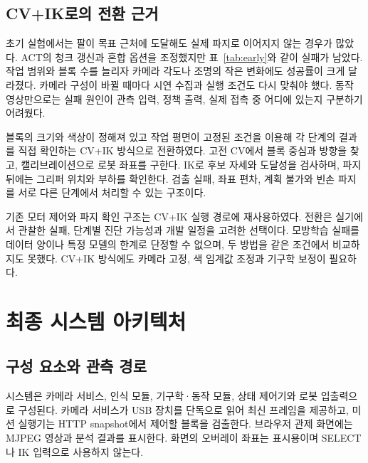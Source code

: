 \subsection{CV+IK로의 전환 근거}
초기 실험에서는 팔이 목표 근처에 도달해도 실제 파지로 이어지지 않는 경우가 많았다. ACT의 청크 갱신과 혼합 옵션을 조정했지만 표~\ref{tab:early}와 같이 실패가 남았다. 작업 범위와 블록 수를 늘리자 카메라 각도나 조명의 작은 변화에도 성공률이 크게 달라졌다. 카메라 구성이 바뀔 때마다 시연 수집과 실행 조건도 다시 맞춰야 했다. 동작 영상만으로는 실패 원인이 관측 입력, 정책 출력, 실제 접촉 중 어디에 있는지 구분하기 어려웠다.

블록의 크기와 색상이 정해져 있고 작업 평면이 고정된 조건을 이용해 각 단계의 결과를 직접 확인하는 CV+IK 방식으로 전환하였다. 고전 CV에서 블록 중심과 방향을 찾고, 캘리브레이션으로 로봇 좌표를 구한다. IK로 후보 자세와 도달성을 검사하며, 파지 뒤에는 그리퍼 위치와 부하를 확인한다. 검출 실패, 좌표 편차, 계획 불가와 빈손 파지를 서로 다른 단계에서 처리할 수 있는 구조이다.

기존 모터 제어와 파지 확인 구조는 CV+IK 실행 경로에 재사용하였다. 전환은 실기에서 관찰한 실패, 단계별 진단 가능성과 개발 일정을 고려한 선택이다. 모방학습 실패를 데이터 양이나 특정 모델의 한계로 단정할 수 없으며, 두 방법을 같은 조건에서 비교하지도 못했다. CV+IK 방식에도 카메라 고정, 색 임계값 조정과 기구학 보정이 필요하다.

\section{최종 시스템 아키텍처}
\subsection{구성 요소와 관측 경로}
시스템은 카메라 서비스, 인식 모듈, 기구학·동작 모듈, 상태 제어기와 로봇 입출력으로 구성된다. 카메라 서비스가 USB 장치를 단독으로 읽어 최신 프레임을 제공하고, 미션 실행기는 HTTP snapshot에서 제어할 블록을 검출한다. 브라우저 관제 화면에는 MJPEG 영상과 분석 결과를 표시한다. 화면의 오버레이 좌표는 표시용이며 SELECT나 IK 입력으로 사용하지 않는다.

